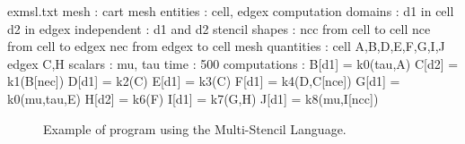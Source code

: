 \begin{filecontents*}{exmsl.txt}
mesh : cart
mesh entities : cell, edgex
computation domains :
  d1 in cell
  d2 in edgex
independent :
  d1 and d2
stencil shapes : 
  ncc from cell to cell
  nce from cell to edgex
  nec from edgex to cell
mesh quantities :
  cell A,B,D,E,F,G,I,J
  edgex C,H
scalars : mu, tau
time : 500
computations :
  B[d1] = k0(tau,A)
  C[d2] = k1(B[nec])
  D[d1] = k2(C)
  E[d1] = k3(C)
  F[d1] = k4(D,C[nce])
  G[d1] = k0(mu,tau,E)
  H[d2] = k6(F)
  I[d1] = k7(G,H)
  J[d1] = k8(mu,I[ncc])
\end{filecontents*}

\begin{figure}[!h]
  \hspace{5mm}
  \begin{minipage}[!h]{0.98\textwidth}
    {}   
    \caption{Example of program using the Multi-Stencil Language. \label{fig:exmsl}}
  \end{minipage}
\end{figure}

